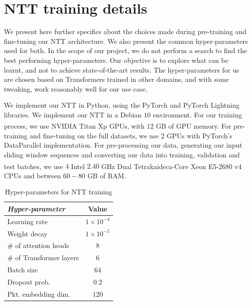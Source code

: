 \chapter{NTT training details}
\label{app:a}

We present here further specifics about the choices made during pre-training and fine-tuning our NTT architecture. We also present the common hyper-parameters used for both. In the scope of our project, we do not perform a search to find the best performing hyper-parameters. Our objective is to explore what can be learnt, and not to achieve state-of-the-art results. The hyper-parameters for us are chosen based on Transformers trained in other domains, and with some tweaking, work reasonably well for our use case.

We implement our NTT in Python, using the PyTorch\cite{pytorch} and PyTorch Lightning\cite{pytorchlit} libraries. We implement our NTT in a Debian $10$ environment. For our training process, we use NVIDIA\textsuperscript{\textregistered} Titan Xp GPUs, with $12$ GB of GPU memory. For pre-training and fine-tuning on the full datasets, we use 2 GPUs with PyTorch's DataParallel implementation. For pre-processing our data, generating our input sliding window sequences and converting our data into training, validation and test batches, we use $4$ Intel\textsuperscript{\textregistered} $2.40$ GHz Dual Tetrakaideca-Core Xeon E5-2680 v4 CPUs and   between $60-80$ GB of RAM. 

\begin{table}[htbp]
\centering
\begin{tabular}{ l   c  }
\toprule
\emph{Hyper-parameter} & Value  \\
                                                       
\midrule
 Learning rate                                         &     $1\times10^{-4}$           \\
 Weight decay					  &       $1\times10^{-5}$          \\
 \# of attention heads 			  &          $8$      \\
 \# of Transformer layers			  &          $6$        \\
 Batch size 			  		&            $64$      \\
 Dropout prob.					&            $0.2$   \\
 Pkt. embedding dim.			&                   $120$     \\
    
\bottomrule

\end{tabular}
\caption{Hyper-parameters for NTT training}
\label{app:table1}
\end{table}

